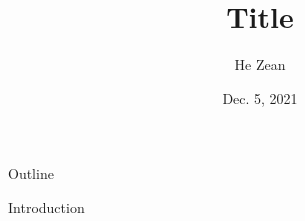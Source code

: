 \documentclass{SUSTechBeamer}
\title{Title}
\author{He Zean \inst{1}}
\institute{
	\inst{1}Dept. of Computer Science and Engineering, SUSTech
}
\date{Dec. 5, 2021}
\begin{document}
\frame{\titlepage}
\section[Outline]{}
\begin{frame}{Outline}
  \tableofcontents[hideallsubsections]
\end{frame}


\begin{frame}{Introduction}

\end{frame}
\end{document}
